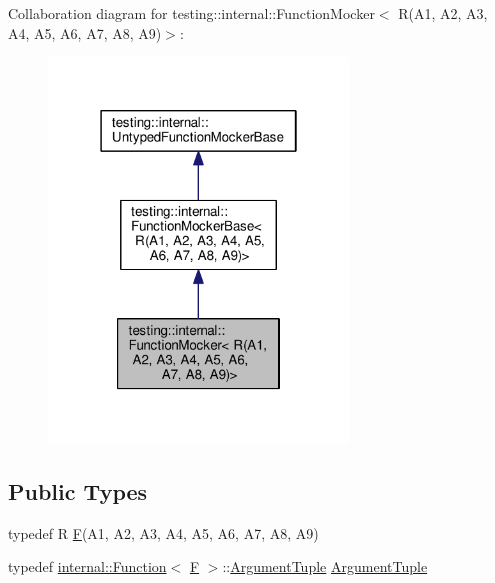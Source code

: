 Collaboration diagram for testing\+:\+:internal\+:\+:Function\+Mocker$<$ R(A1, A2, A3, A4, A5, A6, A7, A8, A9)$>$\+:
\nopagebreak
\begin{figure}[H]
\begin{center}
\leavevmode
\includegraphics[width=226pt]{classtesting_1_1internal_1_1FunctionMocker_3_01R_07A1_00_01A2_00_01A3_00_01A4_00_01A5_00_01A6_00c790a8403db89437fe385ec5706dddb7}
\end{center}
\end{figure}
\subsection*{Public Types}
\begin{DoxyCompactItemize}
\item 
typedef R \hyperlink{classtesting_1_1internal_1_1FunctionMocker_3_01R_07A1_00_01A2_00_01A3_00_01A4_00_01A5_00_01A6_00_01A7_00_01A8_00_01A9_08_4_a8de64ec5559bd4e4410a4374e9c93e4e}{F}(A1, A2, A3, A4, A5, A6, A7, A8, A9)
\item 
typedef \hyperlink{structtesting_1_1internal_1_1Function}{internal\+::\+Function}$<$ \hyperlink{classtesting_1_1internal_1_1FunctionMocker_3_01R_07A1_00_01A2_00_01A3_00_01A4_00_01A5_00_01A6_00_01A7_00_01A8_00_01A9_08_4_a8de64ec5559bd4e4410a4374e9c93e4e}{F} $>$\+::\hyperlink{classtesting_1_1internal_1_1FunctionMocker_3_01R_07A1_00_01A2_00_01A3_00_01A4_00_01A5_00_01A6_00_01A7_00_01A8_00_01A9_08_4_afcb802dfc6e26a318bd0599846bff218}{Argument\+Tuple} \hyperlink{classtesting_1_1internal_1_1FunctionMocker_3_01R_07A1_00_01A2_00_01A3_00_01A4_00_01A5_00_01A6_00_01A7_00_01A8_00_01A9_08_4_afcb802dfc6e26a318bd0599846bff218}{Argument\+Tuple}
\end{DoxyCompactItemize}
